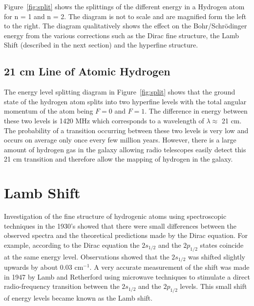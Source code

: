 \documentclass[a4paper]{IEEEtran}
\begin{document}
    Figure~\ref{fig:split} shows the splittings of the different energy
    in a Hydrogen atom for n = 1 and n = 2. The diagram is not to scale and
    are magnified form the left to the right. The diagram qualitatively shows
    the effect on the Bohr/Schr\"odinger energy from the various corrections
    such as the Dirac fine structure, the Lamb Shift (described in the 
    next section) and the hyperfine structure.

    \subsection{21 cm Line of Atomic Hydrogen}
    The energy level splitting diagram in Figure~\ref{fig:split} shows that the ground state of
    the hydrogen atom splits into two hyperfine levels with the total angular
    momentum of the atom being $F=0$ and $F=1$.
    The difference in energy between these two levels is 1420 MHz which corresponds
    to a wavelength of $\lambda \approx $ 21 cm. The probability of a transition
    occurring between these two levels is very low and occurs on average only 
    once every few million years. However, there is a large amount of hydrogen gas
    in the galaxy allowing radio telescopes easily detect this 21 cm transition and
    therefore allow the mapping of hydrogen in the galaxy.

\section{Lamb Shift}
    Investigation of the fine structure of hydrogenic atoms using spectroscopic techniques
    in the 1930's showed that there were small differences between the observed spectra
    and the theoretical predictions made by the Dirac equation.
    For example, according to the Dirac equation the $2s_{1/2}$ and the $2p_{1/2}$ states
    coincide at the same energy level. Observations showed that the $2s_{1/2}$ was shifted 
    slightly upwards by about 0.03 cm$^{-1}$.
    A very accurate measurement of the shift was made in 1947 by Lamb and Retherford using
    microwave techniques to stimulate a direct radio-frequency transition between the 
    $2s_{1/2}$ and the $2p_{1/2}$ levels. This small shift of energy levels became known
    as the Lamb shift.
\end{document}
